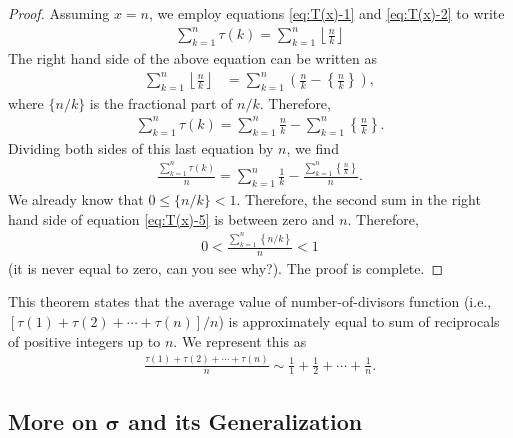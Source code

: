 \documentclass[12pt]{subfile}
\begin{document}
	\begin{proof}
		Assuming $x=n$, we employ equations \ref{eq:T(x)-1} and \ref{eq:T(x)-2} to write
			\begin{align*}
				\sum_{k=1}^{n} \tau(k) = \sum_{k=1}^{n} \left\lfloor \frac{n}{k} \right\rfloor
			\end{align*}
		The right hand side of the above equation can be written as
			\begin{align*}
				\sum_{k=1}^{n} \left\lfloor \frac{n}{k} \right\rfloor &= \sum_{k=1}^{n} \left(\frac{n}{k} - \left\{ \frac{n}{k} \right\}\right),
			\end{align*}
		where $\{n/k\}$ is the fractional part of $n/k$. Therefore,
			\begin{align}
				\sum_{k=1}^{n} \tau(k) = \sum_{k=1}^{n} \frac{n}{k}  - \sum_{k=1}^{n} \left\{ \frac{n}{k} \right\}. \label{eq:T(x)-5}
			\end{align}
		Dividing both sides of this last equation by $n$, we find
			\begin{align}
			\frac{\sum\limits_{k=1}^{n} \tau(k)}{n} = \sum_{k=1}^{n} \frac{1}{k}  - \frac{\sum\limits_{k=1}^{n} \left\{ \frac{n}{k} \right\}}{n}.
			\end{align}
		We already know that $0 \leq \{n/k\}<1$. Therefore, the second sum in the right hand side of equation \ref{eq:T(x)-5} is between zero and $n$. Therefore,
			\begin{align*}
				0 < \frac{\sum_{k=1}^{n} \left\{ n/k \right\}}{n} < 1
			\end{align*}
		(it is never equal to zero, can you see why?). The proof is complete.
	\end{proof}

	\begin{note}
		This theorem states that the average value of number-of-divisors function (i.e., $[\tau(1) +‌\tau(2) + \cdots + \tau(n)]/n$) is approximately equal to sum of reciprocals of positive integers up to $n$. We represent this as
			\begin{align*}
				\frac{\tau(1) + \tau(2) + \cdots + \tau(n)}{n} \sim \frac{1}{1} + \frac{1}{2} + \cdots + \frac{1}{n}.
			\end{align*}
	\end{note}


\subsection{More on \texorpdfstring{$\boldsymbol{\sigma}$}{\textsigma(n)} and its Generalization}
\end{document}
